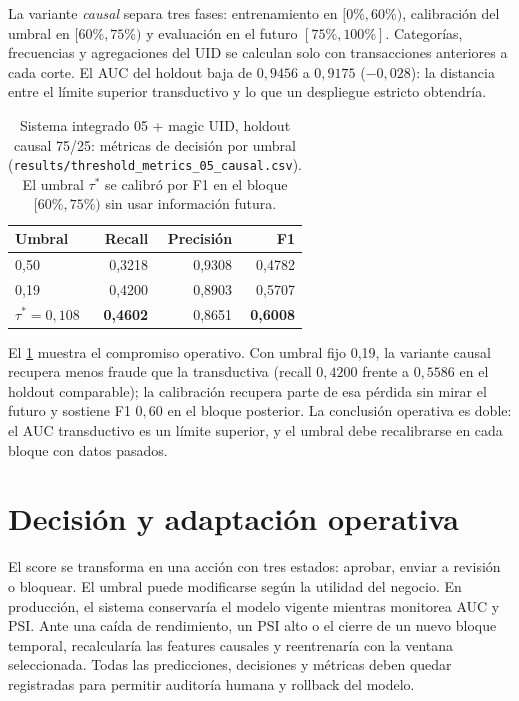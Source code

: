 La variante \emph{causal} separa tres fases: entrenamiento en $[0\%,60\%)$, calibración del umbral en
$[60\%,75\%)$ y evaluación en el futuro $[75\%,100\%]$. Categorías, frecuencias y agregaciones del UID
se calculan solo con transacciones anteriores a cada corte. El AUC del holdout baja de $0{,}9456$ a
$0{,}9175$ ($-0{,}028$): la distancia entre el límite superior transductivo y lo que un despliegue
estricto obtendría.

\begin{table}[ht]
  \centering
  \small
  \caption{Sistema integrado 05 + magic UID, holdout causal 75/25: métricas de decisión por umbral
           (\texttt{results/threshold\_metrics\_05\_causal.csv}). El umbral $\tau^{*}$ se calibró por
           F1 en el bloque $[60\%,75\%)$ sin usar información futura.}
  \label{tab:causal-umbral}
  \begin{tabular}{lrrr}
    \toprule
    Umbral & Recall & Precisión & F1\\
    \midrule
    \rowcolor{mist}
    0,50 & 0,3218 & 0,9308 & 0,4782\\
    0,19 & 0,4200 & 0,8903 & 0,5707\\
    \rowcolor{mist}
    $\tau^{*}=0{,}108$ & \textbf{0,4602} & 0,8651 & \textbf{0,6008}\\
    \bottomrule
  \end{tabular}
\end{table}

El \cref{tab:causal-umbral} muestra el compromiso operativo. Con umbral fijo 0,19, la variante causal
recupera menos fraude que la transductiva (recall $0{,}4200$ frente a $0{,}5586$ en el holdout
comparable); la calibración recupera parte de esa pérdida sin mirar el futuro y sostiene F1 $0{,}60$
en el bloque posterior. La conclusión operativa es doble: el AUC transductivo es un límite superior, y
el umbral debe recalibrarse en cada bloque con datos pasados.

\section{Decisión y adaptación operativa}

El score se transforma en una acción con tres estados: aprobar, enviar a revisión o bloquear. El
umbral puede modificarse según la utilidad del negocio. En producción, el sistema conservaría el
modelo vigente mientras monitorea AUC y PSI. Ante una caída de rendimiento, un PSI alto o el cierre de
un nuevo bloque temporal, recalcularía las features causales y reentrenaría con la ventana seleccionada.
Todas las predicciones, decisiones y métricas deben quedar registradas para permitir auditoría humana
y rollback del modelo.
